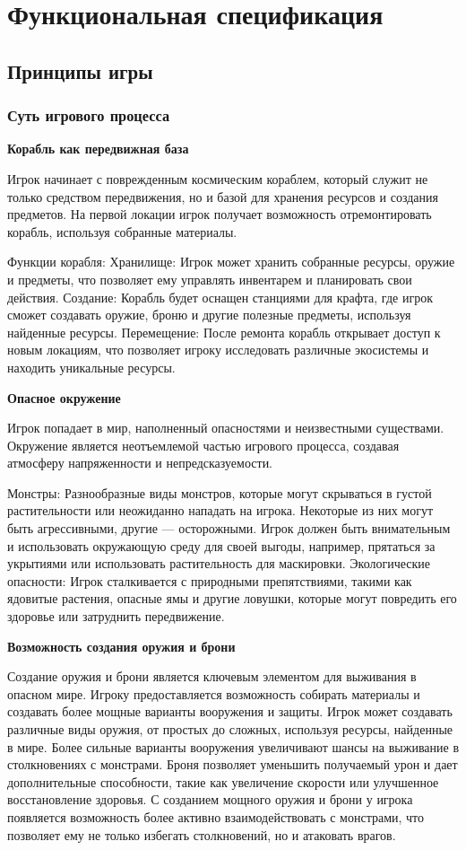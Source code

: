 \documentclass[a4paper,12pt]{article}
\begin{document}
\section{Функциональная спецификация}
\subsection{Принципы игры}
\subsubsection{Суть игрового процесса}
{\textbf{Корабль как передвижная база}}

Игрок начинает с поврежденным космическим кораблем, который служит не только средством передвижения, но и базой для хранения ресурсов и создания предметов. На первой локации игрок получает возможность отремонтировать корабль, используя собранные материалы.

Функции корабля:
Хранилище: Игрок может хранить собранные ресурсы, оружие и предметы, что позволяет ему управлять инвентарем и планировать свои действия.
Создание: Корабль будет оснащен станциями для крафта, где игрок сможет создавать оружие, броню и другие полезные предметы, используя найденные ресурсы.
Перемещение: После ремонта корабль открывает доступ к новым локациям, что позволяет игроку исследовать различные экосистемы и находить уникальные ресурсы.

 
\textbf{{Опасное окружение}}

Игрок попадает в мир, наполненный опасностями и неизвестными существами. Окружение является неотъемлемой частью игрового процесса, создавая атмосферу напряженности и непредсказуемости.

Монстры:
Разнообразные виды монстров, которые могут скрываться в густой растительности или неожиданно нападать на игрока. Некоторые из них могут быть агрессивными, другие — осторожными.
Игрок должен быть внимательным и использовать окружающую среду для своей выгоды, например, прятаться за укрытиями или использовать растительность для маскировки.
Экологические опасности:
Игрок сталкивается с природными препятствиями, такими как ядовитые растения, опасные ямы и другие ловушки, которые могут повредить его здоровье или затруднить передвижение.

\textbf{Возможность создания оружия и брони}

Создание оружия и брони является ключевым элементом для выживания в опасном мире. Игроку предоставляется возможность собирать материалы и создавать более мощные варианты вооружения и защиты.
Игрок может создавать различные виды оружия, от простых до сложных, используя ресурсы, найденные в мире. Более сильные варианты вооружения увеличивают шансы на выживание в столкновениях с монстрами.
Броня позволяет уменьшить получаемый урон и дает дополнительные способности, такие как увеличение скорости или улучшенное восстановление здоровья.
С созданием мощного оружия и брони у игрока появляется возможность более активно взаимодействовать с монстрами, что позволяет ему не только избегать столкновений, но и атаковать врагов.
\end{document}
